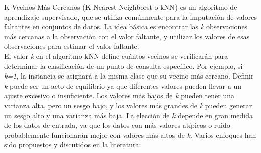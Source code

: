 K-Vecinos Más Cercanos (K-Nearest Neighborst o kNN) es un algoritmo de aprendizaje supervisado, que se utiliza comúnmente para la imputación de valores faltantes en conjuntos de datos. La idea básica es encontrar las \textit{k} observaciones más cercanas a la observación con el valor faltante, y utilizar los valores de esas observaciones para estimar el valor faltante. \\
El valor \textit{k} en el algoritmo kNN define cuántos vecinos se verificarán para determinar la clasificación de un punto de consulta específico. Por ejemplo, si \textit{k=1}, la instancia se asignará a la misma clase que su vecino más cercano. Definir \textit{k} puede ser un acto de equilibrio ya que diferentes valores pueden llevar a un ajuste excesivo o insuficiente. Los valores más bajos de \textit{k} pueden tener una varianza alta, pero un sesgo bajo, y los valores más grandes de \textit{k} pueden generar un sesgo alto y una varianza más baja. La elección de \textit{k} depende en gran medida de los datos de entrada, ya que los datos con más valores atípicos o ruido probablemente funcionarán mejor con valores más altos de \textit{k}. Varios enfoques han sido propuestos y discutidos en la literatura:


